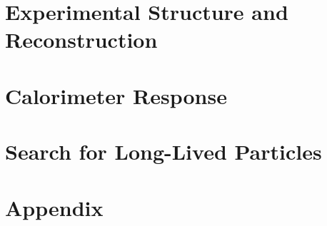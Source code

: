 \part{Experimental Structure and Reconstruction}
\label{part:experiment}




\part{Calorimeter Response}
\label{part:calorimeter}



\part{Search for Long-Lived Particles}
\label{part:llp}







\cleardoublepage %


\appendix

\part{Appendix}
%



\cleardoublepage %




